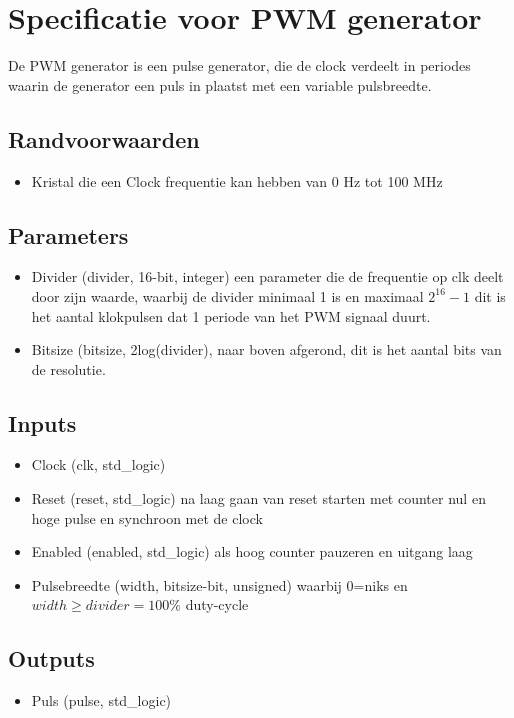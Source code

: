 \documentclass{article}
\begin{document}
\section{Specificatie voor PWM generator}
\label{sec:pwm-spec}
De PWM generator is een pulse generator, die de clock verdeelt in periodes waarin de generator een puls in plaatst met een variable pulsbreedte.
\subsection{Randvoorwaarden}
\begin{itemize}
\item Kristal die een Clock frequentie kan hebben van 0 Hz tot 100 MHz 
\end{itemize}
\subsection{Parameters}
\begin{itemize}
\item Divider (divider, 16-bit, integer) een parameter die de frequentie op clk deelt door zijn waarde, waarbij de divider minimaal 1 is en maximaal $2^{16} -1$ dit is het aantal klokpulsen dat 1 periode van het PWM signaal duurt.
\item Bitsize  (bitsize, 2log(divider), naar boven afgerond, dit is het aantal bits van de resolutie.

\end{itemize}
\subsection{Inputs}
\begin{itemize}
\item Clock (clk, std\_logic)
\item Reset (reset, std\_logic) na laag gaan van reset starten met counter nul en hoge pulse en synchroon met de clock
\item Enabled (enabled, std\_logic) als hoog counter pauzeren en uitgang laag
\item Pulsebreedte (width, bitsize-bit, unsigned) waarbij 0=niks en $width \geq divider = 100\%$ duty-cycle
\end{itemize}
\subsection{Outputs}
\begin{itemize}
\item Puls (pulse, std\_logic)
\end{itemize}
\end{document}
